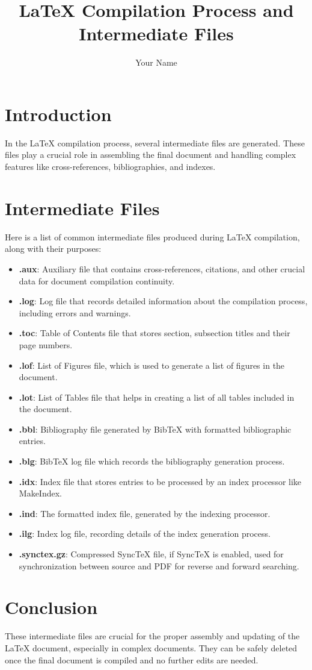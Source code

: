 \documentclass{article}
\title{LaTeX Compilation Process and Intermediate Files}
\author{Your Name}
\date{}
\begin{document}
\maketitle

\section{Introduction}
In the LaTeX compilation process, several intermediate files are generated. These files play a crucial role in assembling the final document and handling complex features like cross-references, bibliographies, and indexes.

\section{Intermediate Files}
Here is a list of common intermediate files produced during LaTeX compilation, along with their purposes:

\begin{itemize}
  \item \textbf{.aux}: Auxiliary file that contains cross-references, citations, and other crucial data for document compilation continuity.
  \item \textbf{.log}: Log file that records detailed information about the compilation process, including errors and warnings.
  \item \textbf{.toc}: Table of Contents file that stores section, subsection titles and their page numbers.
  \item \textbf{.lof}: List of Figures file, which is used to generate a list of figures in the document.
  \item \textbf{.lot}: List of Tables file that helps in creating a list of all tables included in the document.
  \item \textbf{.bbl}: Bibliography file generated by BibTeX with formatted bibliographic entries.
  \item \textbf{.blg}: BibTeX log file which records the bibliography generation process.
  \item \textbf{.idx}: Index file that stores entries to be processed by an index processor like MakeIndex.
  \item \textbf{.ind}: The formatted index file, generated by the indexing processor.
  \item \textbf{.ilg}: Index log file, recording details of the index generation process.
  \item \textbf{.synctex.gz}: Compressed SyncTeX file, if SyncTeX is enabled, used for synchronization between source and PDF for reverse and forward searching.
\end{itemize}

\section{Conclusion}
These intermediate files are crucial for the proper assembly and updating of the LaTeX document, especially in complex documents. They can be safely deleted once the final document is compiled and no further edits are needed.
\end{document}
